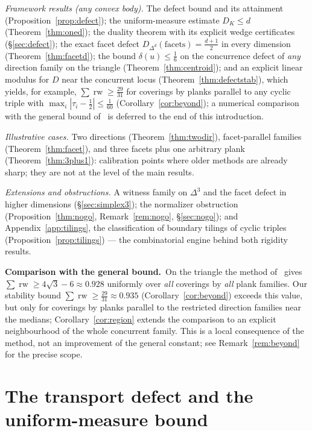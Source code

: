 \documentclass[11pt,reqno]{amsart}
\theoremstyle{plain}
\theoremstyle{definition}
\theoremstyle{remark}
\newcommand{\rw}{\operatorname{rw}}
\begin{document}
\emph{Framework results (any convex body).} The defect bound and its
attainment (Proposition~\ref{prop:defect}); the uniform-measure estimate
$D_K\le d$ (Theorem~\ref{thm:oned}); the duality theorem with its explicit
wedge certificates (\S\ref{sec:defect}); the exact facet defect
$D_{\Delta^d}(\text{facets})=\tfrac{d+1}2$ in every dimension
(Theorem~\ref{thm:facetd}); the bound $\delta(u)\le\tfrac16$ on the concurrence
defect of \emph{any} direction family on the triangle
(Theorem~\ref{thm:centroid}); and an explicit linear modulus for $D$ near the
concurrent locus (Theorem~\ref{thm:defectstab}), which yields, for example,
$\sum\rw\ge\tfrac{29}{31}$ for coverings by planks parallel to any
cyclic triple with $\max_i|\tau_i-\tfrac12|\le\tfrac1{60}$
(Corollary~\ref{cor:beyond}); a numerical comparison with the general bound
of~\cite{BY26} is deferred to the end of this introduction.

\emph{Illustrative cases.} Two directions (Theorem~\ref{thm:twodir}),
facet-parallel families (Theorem~\ref{thm:facet}), and three facets plus one
arbitrary plank (Theorem~\ref{thm:3plus1}): calibration points where older
methods are already sharp; they are not at the level of the main results.

\emph{Extensions and obstructions.} A witness family on $\Delta^3$ and the
facet defect in higher dimensions (\S\ref{sec:simplex3}); the normalizer
obstruction (Proposition~\ref{thm:nogo}, Remark~\ref{rem:nogo},
\S\ref{sec:nogo}); and Appendix~\ref{app:tilings}, the classification of
boundary tilings of cyclic triples (Proposition~\ref{prop:tilings}) --- the
combinatorial engine behind both rigidity results.

\smallskip
\noindent\textbf{Comparison with the general bound.}\ On the triangle the
method of~\cite{BY26} gives $\sum\rw\ge4\sqrt3-6\approx0.928$ uniformly over
\emph{all} coverings by \emph{all} plank families. Our stability bound
$\sum\rw\ge\tfrac{29}{31}\approx0.935$ (Corollary~\ref{cor:beyond}) exceeds
this value, but only for coverings by planks parallel to the restricted
direction families near the medians; Corollary~\ref{cor:region} extends the
comparison to an explicit neighbourhood of the whole concurrent family. This
is a local consequence of the method, not an improvement of the general
constant; see Remark~\ref{rem:beyond} for the precise scope.

\section{The transport defect and the uniform-measure bound}\label{sec:measure}
\end{document}
